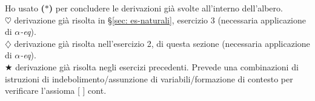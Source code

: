 \begin{enumerate}
\begin{adjustwidth}{-12em}{}
\begin{prooftree}

\end{prooftree}
\end{adjustwidth}
\vspace{0.5cm}
\normalsize
\noindent Ho usato \textbf{($\ast$)} per concludere le derivazioni gi\`a svolte all'interno dell'albero.\\
\textbf{$\heartsuit$} derivazione gi\`a risolta in \S\ref{sec: es-naturali}, esercizio 3 (necessaria applicazione di \textit{$\alpha$-eq}).\\
\textbf{$\diamondsuit$} derivazione gi\`a risolta nell'esercizio 2, di questa sezione (necessaria applicazione di \textit{$\alpha$-eq}).\\
\textbf{$\bigstar$} derivazione gi\`a risolta negli esercizi precedenti. Prevede una combinazioni di istruzioni di indebolimento/assunzione di variabili/formazione di contesto per verificare l'assioma [ ] cont.\\
\end{enumerate}


